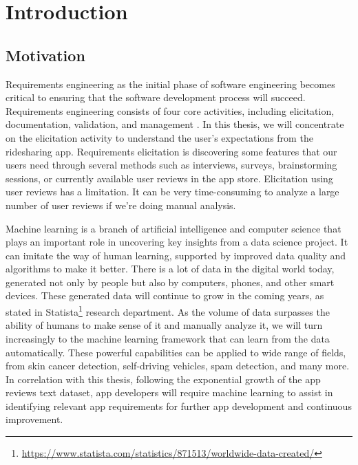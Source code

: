 \documentclass[12pt]{article}
\begin{document}
\newpage
\listoftables

\newpage
\section{Introduction}
\subsection{Motivation}
Requirements engineering as the initial phase of software engineering becomes critical to ensuring that the software development process will succeed. Requirements engineering consists of four core activities, including elicitation, documentation, validation, and management \cite{re_fundamentals}. In this thesis, we will concentrate on the elicitation activity to understand the user’s expectations from the ridesharing app. Requirements elicitation is discovering some features that our users need through several methods such as interviews, surveys, brainstorming sessions, or currently available user reviews in the app store. Elicitation using user reviews has a limitation. It can be very time-consuming to analyze a large number of user reviews if we’re doing manual analysis.

Machine learning is a branch of artificial intelligence and computer science that plays an important role in uncovering key insights from a data science project. It can imitate the way of human learning, supported by improved data quality and algorithms to make it better. There is a lot of data in the digital world today, generated not only by people but also by computers, phones, and other smart devices. These generated data will continue to grow in the coming years, as stated in Statista\footnote{\url{https://www.statista.com/statistics/871513/worldwide-data-created/}} research department. As the volume of data surpasses the ability of humans to make sense of it and manually analyze it, we will turn increasingly to the machine learning framework that can learn from the data automatically. These powerful capabilities can be applied to wide range of fields, from skin cancer detection\cite{skin_cancer_detection}, self-driving vehicles\cite{ml_for_selfdriving_car}, spam detection\cite{ml_for_spam_detection}, and many more. In correlation with this thesis, following the exponential growth of the app reviews text dataset, app developers will require machine learning to assist in identifying relevant app requirements for further app development and continuous improvement.
\end{document}
